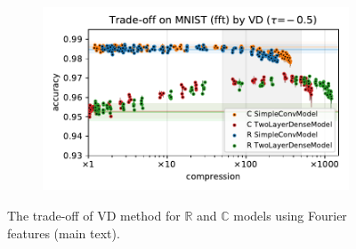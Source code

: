 \documentclass[a4paper,10pt,twocolumn]{article}
\newcommand{\real}{\mathbb{R}}
\newcommand{\cplx}{\mathbb{C}}
\begin{document}
\begin{figure}[b]
\begin{subfigure}[b]{0.5\columnwidth}
  \end{subfigure}%
  \begin{subfigure}[b]{0.5\columnwidth}
    \centering
    \includegraphics[width=\linewidth]{figure__mnist-like__trade-off/legacy__VD__mnist__fft__-0.5.pdf}
  \end{subfigure}
  \caption{%
    The trade-off of VD method for $\real$ and $\cplx$ models using Fourier features (main text).
  }
  \label{fig:paper__mnist-like__trade-off__VD__fft}
\end{figure}
\end{document}
